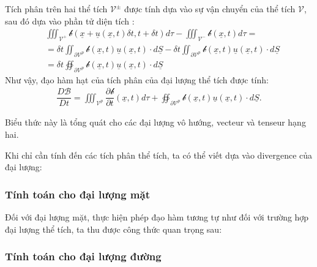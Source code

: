 \documentclass[../../../main.tex]{subfiles}
\begin{document}
		Tích phân trên hai thể tích $\mathscr{V}^{\pm}$ được tính dựa vào sự vận chuyển của thể tích $\mathscr{V}$, sau đó dựa vào phần tử diện tích :
			\[
				\begin{aligned}
					&\iiint_{\mathscr{V}^+}\mathcal{b}\left(\underline{x}+\underline{u}\left(\underline{x},t\right)\delta t,t+\delta t\right)d\tau-\iiint_{\mathscr{V}^-}\mathcal{b}\left(\underline{x},t\right)d\tau=\\
					&=\delta t\iint_{\partial\mathscr{V}^p}\mathcal{b}\left(\underline{x},t\right)\underline{u}\left(\underline{x},t\right)\cdot d\underline{S}-\delta t\iint_{\partial\mathscr{V}^p}\mathcal{b}\left(\underline{x},t\right)\underline{u}\left(\underline{x},t\right)\cdot d\underline{S}\\
					&=\delta t\oiint_{\partial\mathscr{V}^p}\mathcal{b}\left(\underline{x},t\right)\underline{u}\left(\underline{x},t\right)\cdot d\underline{S}
				\end{aligned}
			\]
		Như vậy, đạo hàm hạt của tích phân của đại lượng thể tích được tính:
			\begin{align}
				\boxed{\dfrac{D\mathscr{B}}{Dt}=\iiint_{\mathscr{V}^p}\dfrac{\partial\mathcal{b}}{\partial t}\left(\underline{x},t\right)d\tau+\oiint_{\partial\mathscr{V}^p}\mathcal{b}\left(\underline{x},t\right)\underline{u}\left(\underline{x},t\right)\cdot d\underline{S}}.
			\end{align}

		Biểu thức này là tổng quát cho các đại lượng vô hướng, vecteur và tenseur hạng hai.
		

		Khi chỉ cần tính đến các tích phân thể tích, ta có thể viết dựa vào divergence của đại lượng:

	\subsubsection{Tính toán cho đại lượng mặt}
		Đối với đại lượng mặt, thực hiện phép đạo hàm tương tự như đối với trường hợp đại lượng thể tích, ta thu được công thức quan trọng sau:

	\subsubsection{Tính toán cho đại lượng đường}
\end{document}
